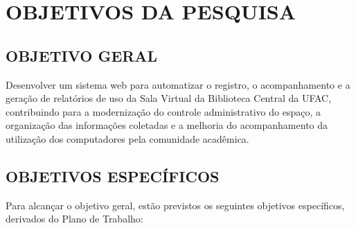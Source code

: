 \documentclass[12pt,a4paper]{article}
\newcommand{\secao}[1]{\clearpage\section{#1}}
\begin{document}
\secao{OBJETIVOS DA PESQUISA}

\subsection{OBJETIVO GERAL}

Desenvolver um sistema web para automatizar o registro, o acompanhamento e a geração de relatórios de uso da Sala Virtual da Biblioteca Central da UFAC, contribuindo para a modernização do controle administrativo do espaço, a organização das informações coletadas e a melhoria do acompanhamento da utilização dos computadores pela comunidade acadêmica.

\subsection{OBJETIVOS ESPECÍFICOS}

Para alcançar o objetivo geral, estão previstos os seguintes objetivos específicos, derivados do Plano de Trabalho:
\end{document}
